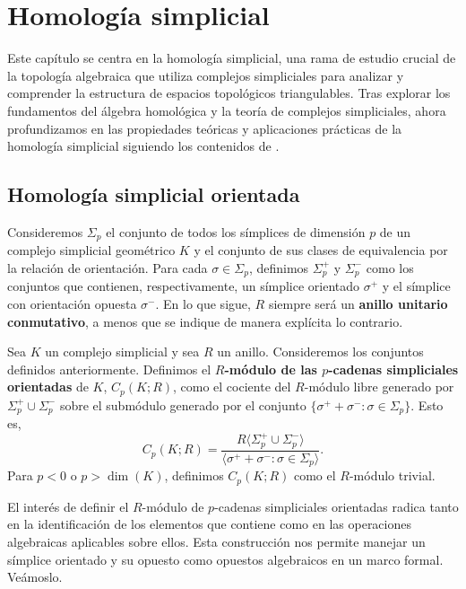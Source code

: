 
\chapter{Homología simplicial}
\label{chapter:homology}

Este capítulo se centra en la homología simplicial, una rama de estudio crucial
de la topología algebraica que utiliza complejos simpliciales para analizar y
comprender la estructura de espacios topológicos triangulables. Tras explorar los
fundamentos del álgebra homológica y la teoría de complejos simpliciales, ahora
profundizamos en las propiedades teóricas y aplicaciones prácticas de la
homología simplicial siguiendo los contenidos de \cite{rafael2003elementos}.

\section{Homología simplicial orientada}
Consideremos \(\Sigma_{p}\) el conjunto de todos los símplices de dimensión \(p\) de
un complejo simplicial geométrico \(K\) y el conjunto de sus clases de equivalencia por la relación de orientación. Para cada \(\sigma \in \Sigma_{p}\), definimos
\(\Sigma_{p}^{+}\) y \(\Sigma_{p}^{-}\) como los conjuntos que contienen, respectivamente,
un símplice orientado \(\sigma^{+}\) y el símplice con orientación opuesta
\(\sigma^{-}\). En lo que sigue, \(R\) siempre será un \textbf{anillo unitario conmutativo}, a menos que se indique de manera explícita lo contrario.

\begin{definicion}
	Sea \(K\) un complejo simplicial y sea \(R\) un anillo. Consideremos los conjuntos definidos anteriormente. Definimos el \textbf{\(R\)-módulo de las \(p\)-cadenas simpliciales orientadas}
	de \(K\), \(C_{p}(K;R)\), como el cociente del \(R\)-módulo libre generado por
	\(\Sigma_{p}^{+}\cup \Sigma_{p}^{-}\) sobre el submódulo generado por el
	conjunto \(\{\sigma^{+}+ \sigma^{-}: \sigma \in \Sigma_{p}\}\). Esto es,
	\[
	C_{p}(K;R) = \frac{R\langle \Sigma_{p}^{+}\cup \Sigma_{p}^{-}\rangle}{\langle
		\sigma^{+}+ \sigma^{-}: \sigma \in \Sigma_{p}\rangle}.
	\]
	Para \(p < 0\) o \(p > \dim(K)\), definimos \(C_{p}(K;R)\) como el \(R\)-módulo trivial.
\end{definicion}
El interés de definir el \(R\)-módulo de \(p\)-cadenas simpliciales orientadas radica
tanto en la identificación de los elementos que contiene como en las operaciones
algebraicas aplicables sobre ellos. Esta construcción nos permite manejar un
símplice orientado y su opuesto como opuestos algebraicos en un marco formal. Veámoslo.

